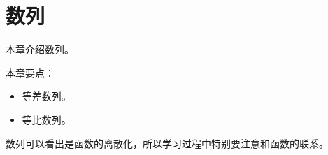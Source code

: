 \chapter{数列}

本章介绍数列。

本章要点：
\begin{itemize}
    \item 等差数列。
    \item 等比数列。
\end{itemize}

\begin{tcolorbox}
数列可以看出是函数的离散化，所以学习过程中特别要注意和函数的联系。
\end{tcolorbox}

\newpage


\newpage


\newpage


\newpage


\newpage





